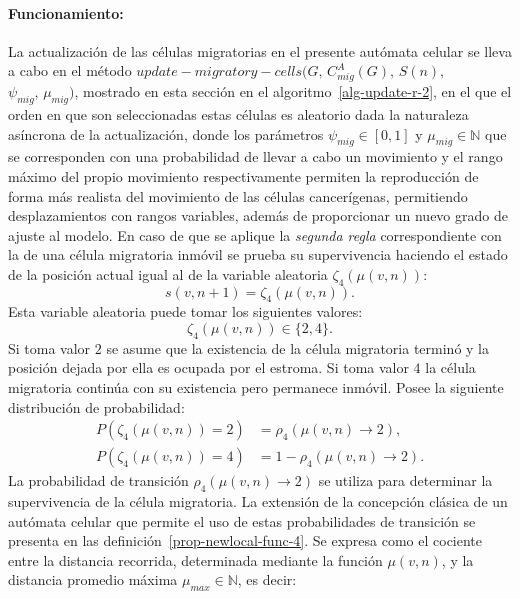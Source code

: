 \paragraph*{{Funcionamiento}:} La actualizaci\'on de las c\'elulas migratorias en el presente aut\'omata celular se lleva a cabo en el m\'etodo $update-migratory-cells(G,\,C_{mig}^A(G),\,S(n),$ $\psi_{mig},\,\mu_{mig})$, mostrado en esta secci\'on en el algoritmo~\ref{alg-update-r-2}, en el que el orden en que son seleccionadas estas c\'elulas es aleatorio dada la naturaleza as\'incrona de la actualizaci\'on, donde los par\'ametros $\psi_{mig} \in [0,1]$ y $\mu_{mig} \in \mathbb{N}$ que se corresponden con una probabilidad de llevar a cabo un movimiento y el rango m\'aximo del propio movimiento respectivamente permiten la reproducci\'on de forma m\'as realista del movimiento de las c\'elulas cancer\'igenas, permitiendo desplazamientos con rangos variables, adem\'as de proporcionar un nuevo grado de ajuste al modelo. En caso de que se aplique la \emph{segunda regla} correspondiente con la de una c\'elula migratoria inm\'ovil se prueba su supervivencia haciendo el estado de la posici\'on actual igual al de la variable aleatoria $\zeta_4(\mu(v,n))$:
\begin{equation*}
s(v,n+1) = \zeta_4(\mu(v,n)).
\end{equation*}
Esta variable aleatoria puede tomar los siguientes valores:
\begin{equation*}
\zeta_4(\mu(v,n)) \in \lbrace 2,4 \rbrace.
\end{equation*}
Si toma valor $2$ se asume que la existencia de la c\'elula migratoria termin\'o y la posici\'on dejada por ella es ocupada por el estroma. Si toma valor $4$ la c\'elula migratoria contin\'ua con su existencia pero permanece inm\'ovil. Posee la siguiente distribuci\'on de probabilidad:
\begin{align*}
P(\zeta_4(\mu(v,n))=2) &= \rho_4(\mu(v,n) \rightarrow 2), \\
P(\zeta_4(\mu(v,n))=4) &= 1 - \rho_4(\mu(v,n) \rightarrow 2).
\end{align*}
La probabilidad de transici\'on $\rho_4(\mu(v,n) \rightarrow 2)$ se utiliza para determinar la supervivencia de la c\'elula migratoria. La extensi\'on de la concepci\'on cl\'asica de un aut\'omata celular que permite el uso de estas probabilidades de transici\'on se presenta en las definici\'on~\ref{prop-newlocal-func-4}. Se expresa como el cociente entre la distancia recorrida, determinada mediante la funci\'on $\mu(v,n)$, y la distancia promedio m\'axima $\mu_{max} \in \mathbb{N}$, es decir:
